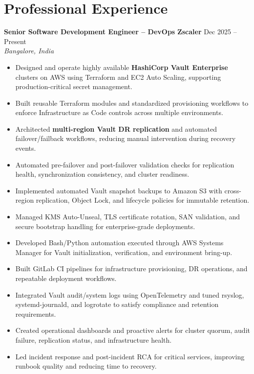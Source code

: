 \documentclass[a4paper,10pt]{article}
\newcommand{\role}[4]{%
  \noindent\textbf{#1} \textbar{} \textbf{#2} \hfill #3\\
  \textit{#4}\vspace{1pt}
}
\begin{document}
\section*{Professional Experience}

\begin{samepage}
\role{Senior Software Development Engineer -- DevOps}{Zscaler}{Dec 2025 -- Present}{Bangalore, India}
\begin{itemize}
    \item Designed and operate highly available \textbf{HashiCorp Vault Enterprise} clusters on AWS using Terraform and EC2 Auto Scaling, supporting production-critical secret management.
    \item Built reusable Terraform modules and standardized provisioning workflows to enforce Infrastructure as Code controls across multiple environments.
    \item Architected \textbf{multi-region Vault DR replication} and automated failover/failback workflows, reducing manual intervention during recovery events.
    \item Automated pre-failover and post-failover validation checks for replication health, synchronization consistency, and cluster readiness.
    \item Implemented automated Vault snapshot backups to Amazon S3 with cross-region replication, Object Lock, and lifecycle policies for immutable retention.
    \item Managed KMS Auto-Unseal, TLS certificate rotation, SAN validation, and secure bootstrap handling for enterprise-grade deployments.
    \item Developed Bash/Python automation executed through AWS Systems Manager for Vault initialization, verification, and environment bring-up.
    \item Built GitLab CI pipelines for infrastructure provisioning, DR operations, and repeatable deployment workflows.
    \item Integrated Vault audit/system logs using OpenTelemetry and tuned rsyslog, systemd-journald, and logrotate to satisfy compliance and retention requirements.
    \item Created operational dashboards and proactive alerts for cluster quorum, audit failure, replication status, and infrastructure health.
    \item Led incident response and post-incident RCA for critical services, improving runbook quality and reducing time to recovery.
\end{itemize}
\end{samepage}
\end{document}
